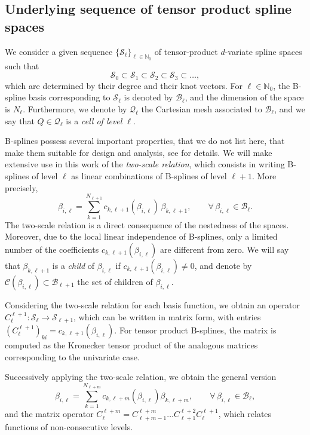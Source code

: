 \documentclass[a4paper]{siamltex1213}
\newcommand{\Rd}{\color{red}}
\renewcommand{\Rd}{\color{black}}
\newcommand\NN{\mathbb N}
\newcommand\BB{\mathcal B}
\newcommand\QQ{\mathcal Q}
\newcommand\VV{\mathcal S}
\newcommand\CC{\mathcal C}
\begin{document}
\subsection{Underlying sequence of tensor product spline spaces} \label{sec:B-splines}
We consider a given sequence $\{\VV_\ell\}_{\ell \in\NN_0}$ of tensor-product $d$-variate spline spaces such that
\begin{equation}\label{E:tensor-product spaces}
 \VV_0\subset \VV_1\subset \VV_2\subset\VV_3\subset\dots,
\end{equation}
which are determined by their degree and their knot vectors. 
For $\ell\in\NN_0$, the B-spline basis corresponding to $\VV_\ell$ is denoted by $\BB_\ell$, and the dimension of the space is $N_\ell$. Furthermore, we denote by $\QQ_\ell$ the Cartesian mesh associated to $\BB_\ell$, and we say that $Q\in\QQ_\ell$ is a \emph{cell of level $\ell$}.

B-splines possess several important properties, that we do not list here, that make them suitable for design and analysis, see \cite{DeBoor, Schumi,IGA-book} for details. We will make extensive use in this work of the \emph{two-scale relation}, which consists in writing B-splines of level $\ell$ as linear combinations of B-splines of level $\ell+1$. More precisely, 
\begin{equation} \label{E:two scale relation}
 \beta_{i,\ell} = \sum_{k=1}^{N_{\ell+1}}
c_{k,\ell+1}(\beta_{i,\ell}) \, \beta_{k,\ell+1}, 
\qquad \forall\,\beta_{i,\ell} \in\BB_\ell.
\end{equation}
The two-scale relation is a direct consequence of the nestedness of the spaces. Moreover, due to the local linear independence of B-splines, only a limited number of the coefficients $c_{k,\ell+1}(\beta_{i,\ell})$ are different from zero. We will say that $\beta_{k,\ell+1}$ is a \emph{child} of $\beta_{i,\ell}$ if $c_{k,\ell+1}(\beta_{i,\ell}) \ne 0$, and denote by $\CC(\beta_{i,\ell})\subset\BB_{\ell+1}$ the set of children of $\beta_{i,\ell}$.

Considering the two-scale relation for each basis function, we obtain an operator $C_\ell^{\ell+1}: \VV_\ell \longrightarrow \VV_{\ell+1}$, which can be written in matrix form, {\Rd with entries $(C_\ell^{\ell+1})_{ki} = c_{k,\ell+1}(\beta_{i,\ell})$.} For tensor product B-splines, the matrix is computed as the Kronecker tensor product of the analogous matrices corresponding to the univariate case.

Successively applying the two-scale relation, we obtain the general version
\begin{equation*}
 \beta_{i,\ell} = \sum_{k=1}^{N_{\ell+m}}
c_{k,\ell+m}(\beta_{i,\ell})\beta_{k,\ell+m}, 
\qquad \forall\,\beta_{i,\ell} \in\BB_\ell,
\end{equation*}
and the matrix operator $C_\ell^{\ell+m} = C_{\ell+m-1}^{\ell+m} \ldots C_{\ell+1}^{\ell+2} C_\ell^{\ell+1}$, which relates functions of non-consecutive levels.
\end{document}

